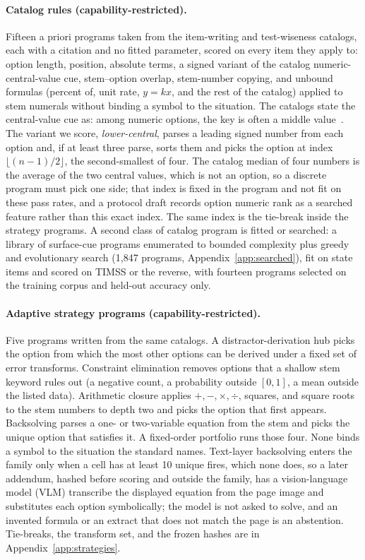\paragraph{Catalog rules (capability-restricted).}
Fifteen a priori programs taken from the item-writing and test-wiseness catalogs, each with a citation and no fitted parameter, scored on every item they apply to: option length, position, absolute terms, a signed variant of the catalog numeric-central-value cue, stem--option overlap, stem-number copying, and unbound formulas (percent of, unit rate, $y=kx$, and the rest of the catalog) applied to stem numerals without binding a symbol to the situation. The catalogs state the central-value cue as: among numeric options, the key is often a middle value~\cite{Millman_1965,Haladyna_2002}. The variant we score, \emph{lower-central}, parses a leading signed number from each option and, if at least three parse, sorts them and picks the option at index $\lfloor (n-1)/2 \rfloor$, the second-smallest of four. The catalog median of four numbers is the average of the two central values, which is not an option, so a discrete program must pick one side; that index is fixed in the program and not fit on these pass rates, and a protocol draft records option numeric rank as a searched feature rather than this exact index. The same index is the tie-break inside the strategy programs. A second class of catalog program is fitted or searched: a library of surface-cue programs enumerated to bounded complexity plus greedy and evolutionary search (1{,}847 programs, Appendix~\ref{app:searched}), fit on state items and scored on TIMSS or the reverse, with fourteen programs selected on the training corpus and held-out accuracy only.

\paragraph{Adaptive strategy programs (capability-restricted).}
Five programs written from the same catalogs. A distractor-derivation hub picks the option from which the most other options can be derived under a fixed set of error transforms. Constraint elimination removes options that a shallow stem keyword rules out (a negative count, a probability outside $[0,1]$, a mean outside the listed data). Arithmetic closure applies $+,-,\times,\div$, squares, and square roots to the stem numbers to depth two and picks the option that first appears. Backsolving parses a one- or two-variable equation from the stem and picks the unique option that satisfies it. A fixed-order portfolio runs those four. None binds a symbol to the situation the standard names. Text-layer backsolving enters the family only when a cell has at least 10 unique fires, which none does, so a later addendum, hashed before scoring and outside the family, has a vision-language model (VLM) transcribe the displayed equation from the page image and substitutes each option symbolically; the model is not asked to solve, and an invented formula or an extract that does not match the page is an abstention. Tie-breaks, the transform set, and the frozen hashes are in Appendix~\ref{app:strategies}.

